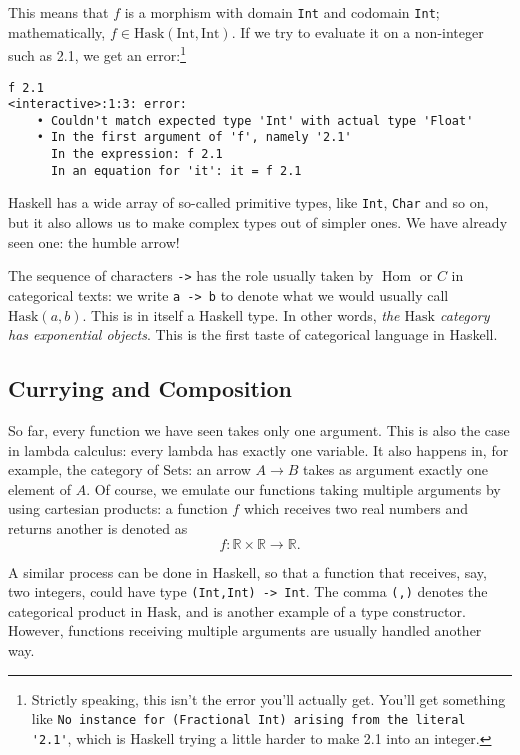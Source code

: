 \documentclass[11pt]{article}
\theoremstyle{nonumberplain}
\newcommand{\R}{\mathbb{R}}
\newcommand{\Hask}{\mathrm{Hask}}
\newcommand{\type}[1]{\mathrm{#1}}
\newcommand{\cat}[1]{\mathrm{#1}}
\DeclareMathOperator{\Hom}{Hom}
\newcommand*\lsin{\lstinline}
\begin{document}
This means that $f$ is a morphism with domain \lstinline|Int| and codomain \lstinline|Int|; mathematically, $f \in \Hask(\type{Int}, \type{Int})$. If we try to evaluate it on a non-integer such as 2.1, we get an error:\footnote{Strictly speaking, this isn't the error you'll actually get. You'll get something like \lstinline|No instance for (Fractional Int) arising from the literal '2.1'|, which is Haskell trying a little harder to make 2.1 into an integer.}
\begin{lstlisting}
f 2.1
<interactive>:1:3: error:
    • Couldn't match expected type 'Int' with actual type 'Float'
    • In the first argument of 'f', namely '2.1'
      In the expression: f 2.1
      In an equation for 'it': it = f 2.1
\end{lstlisting}

Haskell has a wide array of so-called primitive types, like \lstinline|Int|, \lstinline|Char| and so on, but it also allows us to make complex types out of simpler ones. We have already seen one: the humble arrow!

The sequence of characters \lstinline|->| has the role usually taken by $\Hom$ or $C$ in categorical texts: we write \lsin|a -> b| to denote what we would usually call $\Hask(a,b)$. This is in itself a Haskell type. In other words, \emph{the $\Hask$ category has exponential objects}. This is the first taste of categorical language in Haskell.

\subsection{Currying and Composition}

So far, every function we have seen takes only one argument. This is also the case in lambda calculus: every lambda has exactly one variable. It also happens in, for example, the category of $\cat{Sets}$: an arrow $A \to B$ takes as argument exactly one element of $A$. Of course, we emulate our functions taking multiple arguments by using cartesian products: a function $f$ which receives two real numbers and returns another is denoted as
\begin{equation}
f \colon \R \times \R \to \R.
\end{equation}

A similar process can be done in Haskell, so that a function that receives, say, two integers, could have type \lsin|(Int,Int) -> Int|. The comma \lsin|(,)| denotes the categorical product in $\Hask$, and is another example of a type constructor. However, functions receiving multiple arguments are usually handled another way.
\end{document}
